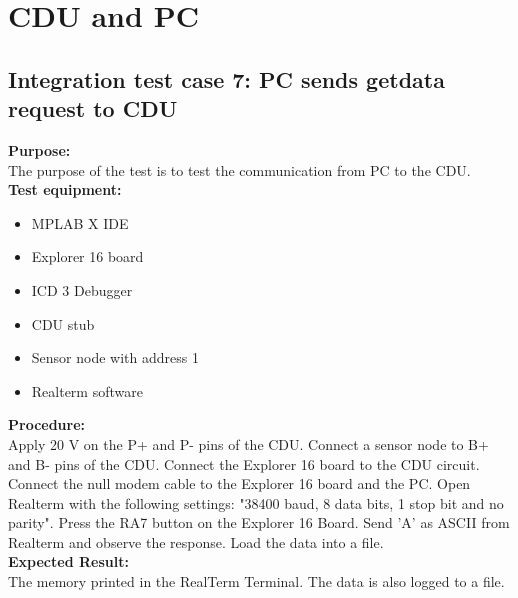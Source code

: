 \section{CDU and PC}
\subsection{Integration test case 7: PC sends getdata request to CDU}
\textbf{Purpose:}\\
The purpose of the test is to test the communication from PC to the CDU.\\

\textbf{Test equipment:}
\begin{itemize}
\item MPLAB X IDE
\item Explorer 16 board
\item ICD 3 Debugger
\item CDU stub
\item Sensor node with address 1
\item Realterm software
\end{itemize}

\textbf{Procedure:}\\
Apply 20 V on the P+ and P- pins of the CDU. Connect a sensor node to B+ and B- pins of the CDU. Connect the Explorer 16 board to the CDU circuit. Connect the null modem cable to the Explorer 16 board and the PC. Open Realterm with the following settings: "38400 baud, 8 data bits, 1 stop bit and no parity". Press the RA7 button on the Explorer 16 Board. Send 'A' as ASCII from Realterm and observe the response. Load the data into a file.\\

\textbf{Expected Result:}\\
The memory printed in the RealTerm Terminal. The data is also logged to a file.\\

